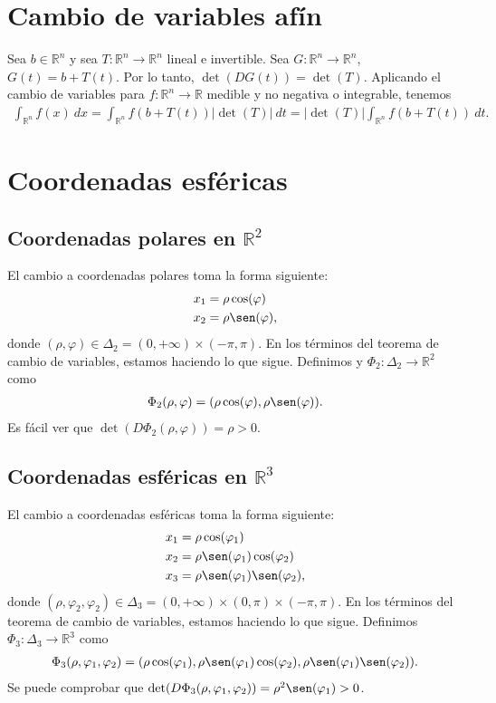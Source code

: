 \section{Cambio de variables afín}
Sea $b \in \mathbb{R}^n$ y sea $T: \mathbb{R}^n \longrightarrow \mathbb{R}^n$ lineal e invertible. Sea $G : \mathbb{R}^n \longrightarrow \mathbb{R}^n$, $G(t) = b + T(t)$. Por lo tanto, $\det(DG(t)) = \det(T)$. Aplicando el cambio de variables para $f: \mathbb{R}^n \longrightarrow \mathbb{R}$ medible y no negativa o integrable, tenemos
\begin{align*}
    \int_{\mathbb{R}^n}{f(x) \ dx} = \int_{\mathbb{R}^n}{f(b + T(t))|\det(T)| \ dt} = |\det(T)|\int_{\mathbb{R}^n}{f(b + T(t)) \ dt}.
\end{align*}

\section{Coordenadas esféricas}

\subsection{Coordenadas polares en $\mathbb{R}^2$}

El cambio a coordenadas polares toma la forma siguiente:
\begin{align*}
    x_1 & = \rho \cos(\varphi)  \\
    x_2 & = \rho \sen(\varphi),
\end{align*}
donde $(\rho, \varphi) \in \Delta_2 = (0,+\infty)\times(-\pi,\pi)$. En los términos del teorema de cambio de variables, estamos haciendo lo que sigue. Definimos y $\Phi_2 : \Delta_2 \longrightarrow \mathbb{R}^2$ como
\begin{align*}
    \Phi_2(\rho, \varphi) = (\rho \cos(\varphi), \rho \sen(\varphi)).
\end{align*}
Es fácil ver que $\det(D\Phi_2(\rho, \varphi)) = \rho > 0$.

\subsection{Coordenadas esféricas en $\mathbb{R}^3$}
El cambio a coordenadas esféricas toma la forma siguiente:
\begin{align*}
    x_1 & = \rho \cos(\varphi_1)                  \\
    x_2 & = \rho \sen(\varphi_1) \cos(\varphi_2)  \\
    x_3 & = \rho \sen(\varphi_1) \sen(\varphi_2),
\end{align*}
donde $(\rho, \varphi_2, \varphi_2) \in \Delta_3 = (0,+\infty)\times(0,\pi)\times(-\pi,\pi)$. En los términos del teorema de cambio de variables, estamos haciendo lo que sigue. Definimos $\Phi_3 : \Delta_3 \longrightarrow \mathbb{R}^3$ como
\begin{align*}
    \Phi_3(\rho, \varphi_1, \varphi_2) = (\rho \cos(\varphi_1), \rho \sen(\varphi_1) \cos(\varphi_2), \rho \sen(\varphi_1) \sen(\varphi_2)).
\end{align*}
Se puede comprobar que $\det(D\Phi_3(\rho, \varphi_1, \varphi_2)) = \rho^2 \sen(\varphi_1) > 0$.

